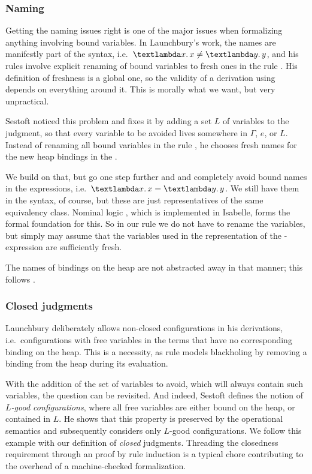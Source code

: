 \documentclass{jfp1}
\theoremstyle{nonumberbreak}
\newcommand{\keyword}[1]{\text{\textsf{#1}}}
\newcommand{\sLam}[2]{\text{\textlambda} #1.\, #2}
\newcommand{\sRule}[1]{\text{{\textsc{#1}}}}
\begin{document}
\subsubsection{Naming}

Getting the naming issues right is one of the major issues when formalizing anything involving bound variables. In Launchbury's work, the names are manifestly part of the syntax, i.e.\ $\sLam x x \ne \sLam y y$, and his rules involve explicit renaming of bound variables to fresh ones in the rule \sRule{Var}. His definition of freshness is a global one, so the validity of a derivation using \sRule{Var} depends on everything around it. This is morally what we want, but very unpractical.

Sestoft  noticed this problem and fixes it by adding a set $L$ of variables to the judgment, so that every variable to be avoided lives somewhere in $\Gamma$, $e$, or $L$. Instead of renaming all bound variables in the rule \sRule{Var}, he chooses fresh names for the new heap bindings in the \sRule{Let}.

We build on that, but go one step further and and completely avoid bound names in the expressions, i.e.\ $\sLam x x = \sLam y y$. We still have them in the syntax, of course, but these are just representatives of the same equivalency class. Nominal logic \cite{nominal}, which is implemented in Isabelle, forms the formal foundation for this. So in our rule \sRule{Let} we do not have to rename the variables, but simply may assume that the variables used in the representation of the \keyword{let}-expression are sufficiently fresh.

The names of bindings on the heap are not abstracted away in that manner; this follows \cite{nameless}.

\subsubsection{Closed judgments}

Launchbury deliberately allows non-closed configurations in his derivations, i.e.\ configurations with free variables in the terms that have no corresponding binding on the heap. This is a necessity, as rule \sRule{Var} models blackholing by removing a binding from the heap during its evaluation.

With the addition of the set of variables to avoid, which will always contain such variables, the question can be revisited. And indeed, Sestoft defines the notion of \emph{$L$-good configurations}, where all free variables are either bound on the heap, or contained in $L$. He shows that this property is preserved by the operational semantics and subsequently considers only $L$-good configurations. We follow this example with our definition of \emph{closed} judgments. Threading the closedness requirement through an proof by rule induction is a typical chore contributing to the overhead of a machine-checked formalization.
\end{document}
